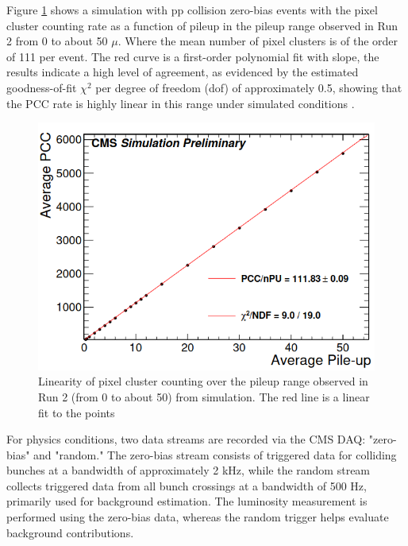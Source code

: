 Figure \ref{pileup} shows a simulation with pp collision zero-bias events with the pixel cluster counting rate as a function of pileup in the pileup range observed in Run 2 from 0 to about 50 $\mu$. Where the mean number of pixel clusters is of the order of  111 per event. The red curve is a first-order polynomial fit with slope, the results indicate a high level of agreement, as evidenced by the estimated goodness-of-fit $\chi^{2}$ per degree of freedom (dof) of approximately 0.5, showing that the PCC rate is highly linear in this range under simulated conditions \cite{ Phase2_Upgrade,lumi_precise_2015_2016}.


\begin{center}
  \begin{figure}[h!]
    \centering
    \includegraphics[scale=.35]{Chapter3/pileup_lineality.png} 
    \caption[PCC linearity with pile-up]{ Linearity of pixel cluster counting over the pileup range observed in Run 2 (from 0 to about 50) from simulation. The red line is a linear fit to the points \cite{Phase2_Upgrade} }
    \label{pileup}
  \end{figure}
\end{center}

For physics conditions, two data streams are recorded via the CMS DAQ: "zero-bias" and "random." The zero-bias stream consists of triggered data for colliding bunches at a bandwidth of approximately 2 kHz, while the random stream collects triggered data from all bunch crossings at a bandwidth of 500 Hz, primarily used for background estimation. The luminosity measurement is performed using the zero-bias data, whereas the random trigger helps evaluate background contributions.  

